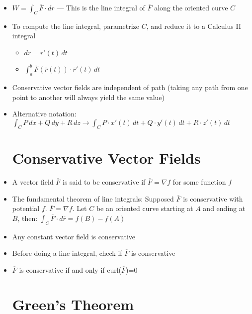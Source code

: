 \begin{itemize}
  \item $W=\displaystyle \int_C \overline{F}\cdot dr$ — This is the line integral of $\overline{F}$ along the oriented curve $C$

  \item To compute the line integral, parametrize $C$, and reduce it to a Calculus II integral

    \begin{itemize}

      \item $d\overline{r} = \overline{r}'(t)\,dt$

      \item $\displaystyle \int_a^b \overline{F}(\overline{r}(t))\cdot \overline{r}'(t)\,dt$

    \end{itemize}

  \item Conservative vector fields are independent of path (taking any path from one point to another will always yield the same value)

  \item Alternative notation: $\displaystyle \int_C P\,dx + Q\,dy + R\,dz \rightarrow \int_C P\cdot x'(t)\,dt + Q\cdot y'(t)\,dt + R\cdot z'(t)\,dt$

    \section{Conservative Vector Fields}

  \item A vector field $\overline{F}$ is said to be conservative if $\overline{F} = \nabla f$ for some function $f$

  \item The fundamental theorem of line integrals: Supposed $\overline{F}$ is conservative with potential $f$. $\overline{F}=\nabla f$. Let $C$ be an oriented curve starting at $A$ and ending at $B$, then: $\displaystyle \int_C \overline{F}\cdot d\overline{r}=f(B)-f(A)$

  \item Any constant vector field is conservative

  \item Before doing a line integral, check if $\overline{F}$ is conservative

  \item $\overline{F}$ is conservative if and only if curl($\overline{F}$)=0

    \section{Green's Theorem}


\end{itemize}
